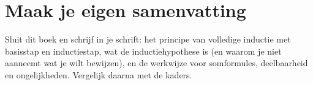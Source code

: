 
\begin{oefeningen}





\end{oefeningen}


\ifzelfstudie
\section*{Maak je eigen samenvatting}
Sluit dit boek en schrijf in je schrift: het principe van volledige inductie met basisstap en inductiestap, wat de inductiehypothese is (en waarom je niet aanneemt wat je wilt bewijzen), en de werkwijze voor somformules, deelbaarheid en ongelijkheden. Vergelijk daarna met de kaders.
\fi
